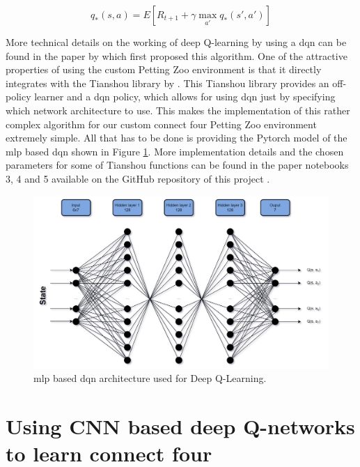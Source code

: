 \begin{equation}
q_*(s, a) = E[ R_{t+1} + \gamma \max_{a'} q_* (s', a') ]
\label{eq:bellman}
\end{equation}

More technical details on the working of deep Q-learning by using a \gls{dqn} can be found in the paper by \citet{dqn} which first proposed this algorithm.
One of the attractive properties of using the custom Petting Zoo environment is that it directly integrates with the Tianshou library by \citet{tianshou}.
This Tianshou library provides an off-policy learner and a \gls{dqn} policy, which allows for using \gls{dqn} just by specifying which network architecture to use.
This makes the implementation of this rather complex algorithm for our custom connect four Petting Zoo environment extremely simple.
All that has to be done is providing the Pytorch model of the \gls{mlp} based \gls{dqn} shown in Figure \ref{fig:mlp_dqn}.
More implementation details and the chosen parameters for some of Tianshou functions can be found in the paper notebooks 3, 4 and 5 available on the GitHub repository of this project \citep{github_project}.

\begin{figure}[ht]
    \centering
    \includegraphics[width=1\linewidth]{images/mlp_dqn.png}
    \captionsetup{width=0.9\linewidth}
    \captionsetup{justification=centering}
    \caption{\gls{mlp} based \gls{dqn} architecture used for Deep Q-Learning.}
    \label{fig:mlp_dqn}
\end{figure}


\section{Using CNN based deep Q-networks to learn connect four}
\label{sec:connect_four_rl-cnn-dqn}

